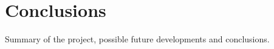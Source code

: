 \documentclass[a4paper]{article}
\begin{document}
\section{Conclusions}
Summary of the project, possible future developments and
conclusions.


 






\end{document}
